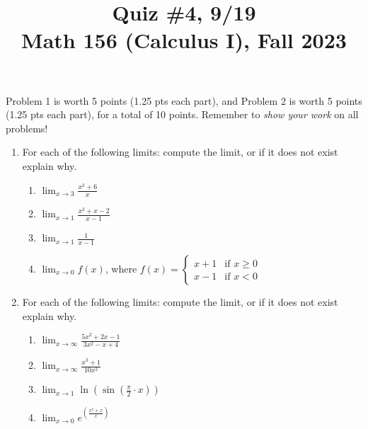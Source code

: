 \documentclass[11pt]{article}
\title{Quiz \#4, 9/19 \\ Math 156 (Calculus I), Fall 2023}
\date{}
\begin{document}
\maketitle

\thispagestyle{empty}

\vspace{-2cm}

Problem 1 is worth 5 points (1.25 pts each part), and Problem 2 is worth 5 points (1.25 pts each part), for a total of 10 points. Remember to \emph{show your work} on all problems!

\begin{enumerate}
\item For each of the following limits: compute the limit, or if it does not exist explain why.
\begin{enumerate}
\item $\displaystyle \lim_{x \to 3} \frac{x^2+6}{x}$
\item $\displaystyle \lim_{x \to 1} \frac{x^2+x-2}{x-1}$
\item $\displaystyle \lim_{x \to 1} \frac{1}{x-1}$
\item $\displaystyle \lim_{x \to 0} f(x)$, where $f(x) = \begin{cases} x+1 &\textrm{if $x \geq 0$} \\ x-1 &\textrm{if $x < 0$} \end{cases}$
\end{enumerate}

\vspace{2.15in}

\item For each of the following limits: compute the limit, or if it does not exist explain why.
\begin{enumerate}
\item $\displaystyle \lim_{x \to \infty} \frac{5x^2+2x-1}{3x^2-x+4}$
\item $\displaystyle \lim_{x \to \infty} \frac{x^3+1}{10x^2}$
\item $\displaystyle \lim_{x \to 1} \ln(\sin(\frac{\pi}{2} \cdot x))$
\item $\displaystyle \lim_{x \to 0} e^{(\frac{x^2+x}{x})}$
\end{enumerate}

\end{enumerate}
\end{document}
